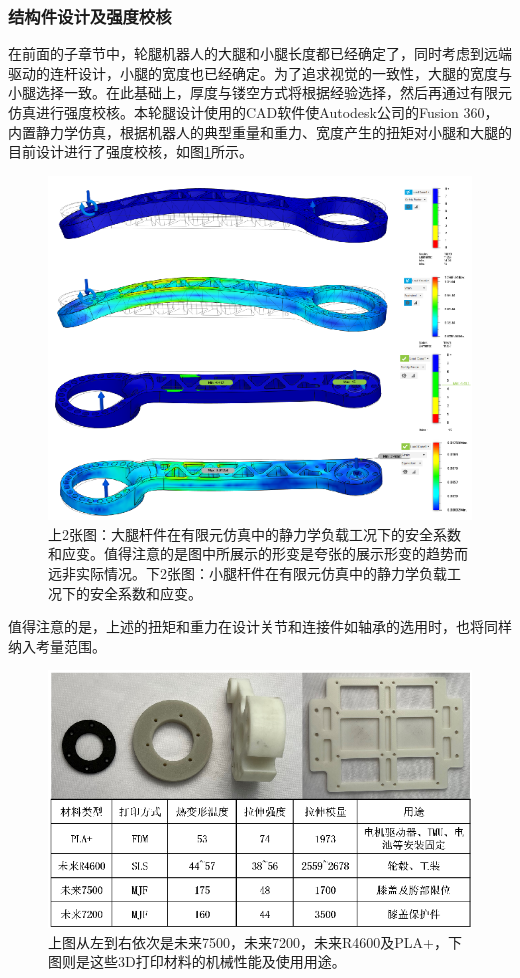 \subsubsection{结构件设计及强度校核}
在前面的子章节中，轮腿机器人的大腿和小腿长度都已经确定了，同时考虑到远端驱动的连杆设计，小腿的宽度也已经确定。为了追求视觉的一致性，大腿的宽度与小腿选择一致。在此基础上，厚度与镂空方式将根据经验选择，然后再通过有限元仿真进行强度校核。本轮腿设计使用的CAD软件使Autodesk公司的Fusion 360，内置静力学仿真，根据机器人的典型重量和重力、宽度产生的扭矩对小腿和大腿的目前设计进行了强度校核，如图\ref{fig:sec2-simu}所示。

\begin{figure}
  \centering
  \includegraphics[width=0.85\linewidth]{figures/Sec2/simu.png}
  \caption{
  上2张图：大腿杆件在有限元仿真中的静力学负载工况下的安全系数和应变。值得注意的是图中所展示的形变是夸张的展示形变的趋势而远非实际情况。下2张图：小腿杆件在有限元仿真中的静力学负载工况下的安全系数和应变。
  }
  \label{fig:sec2-simu}
   \vspace{5pt}
\end{figure}

值得注意的是，上述的扭矩和重力在设计关节和连接件如轴承的选用时，也将同样纳入考量范围。

\begin{figure}[h!]
  \centering
  \includegraphics[width=0.85\linewidth]{figures/Sec2/3dp.png}
  \caption{
  上图从左到右依次是未来7500，未来7200，未来R4600及PLA+，下图则是这些3D打印材料的机械性能及使用用途。
  }
  \label{fig:sec2-3dp}
   \vspace{6pt}
\end{figure}

